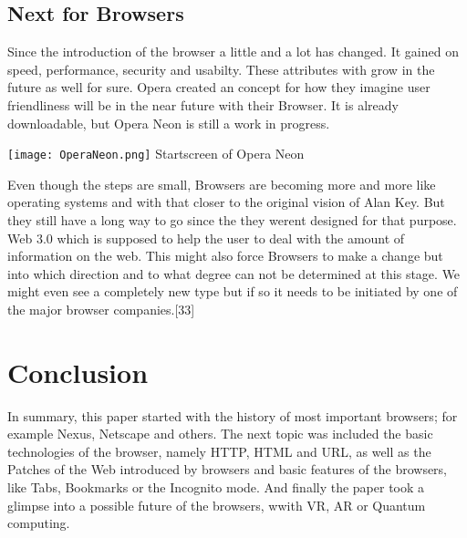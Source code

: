 \documentclass[runningheads]{llncs}
\begin{document}
		\subsection{Next for Browsers}
			Since the introduction of the browser a little and a lot has changed. It gained on speed, performance, security and usabilty. These attributes with grow in the future as well for sure. 
			Opera created an concept for how they imagine user friendliness will be in the near future with their Browser. It is already downloadable, but Opera Neon is still a work in progress.
		 	\begin{center}
		 		\texttt{[image: OperaNeon.png]}
		 		Startscreen of Opera Neon
		 	\end{center}
		 	
			Even though the steps are small, Browsers are becoming more and more like operating systems and with that closer to the original vision of Alan Key. But they still have a long way to go since the they werent designed for that purpose.
			Web 3.0 which is supposed to help the user to deal with the amount of information on the web. This might also force Browsers to make a change but into which direction and to what degree can not be determined at this stage. We might even see a completely new type but if so it needs to be initiated by one of the major browser companies.[33]
	\section{Conclusion}
	In summary, this paper started with the history of most important browsers; for example Nexus, Netscape and others. The next topic was included the basic technologies of the browser, namely HTTP, HTML and URL, as well as the Patches of the Web introduced by browsers and basic features of the browsers, like Tabs, Bookmarks or the Incognito mode. And finally the paper took a glimpse into a possible future of the browsers, wwith VR, AR or Quantum computing.
\end{document}
